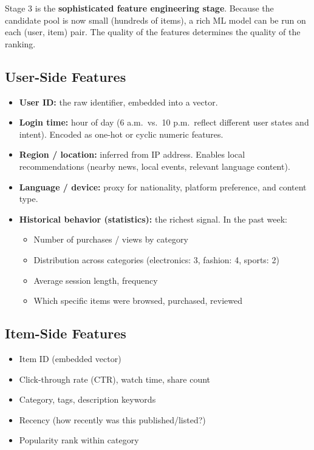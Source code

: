 \documentclass[11pt]{article}
\begin{document}
Stage 3 is the \textbf{sophisticated feature engineering stage}. Because
the candidate pool is now small (hundreds of items), a rich ML model
can be run on each (user, item) pair. The quality of the features
determines the quality of the ranking.

\subsection{User-Side Features}
\begin{itemize}
    \item \textbf{User ID:} the raw identifier, embedded into a vector.
    \item \textbf{Login time:} hour of day (6 a.m.\ vs.\ 10 p.m.\ reflect
      different user states and intent). Encoded as one-hot or cyclic
      numeric features.
    \item \textbf{Region / location:} inferred from IP address.
      Enables local recommendations (nearby news, local events, relevant
      language content).
    \item \textbf{Language / device:} proxy for nationality, platform
      preference, and content type.
    \item \textbf{Historical behavior (statistics):} the richest signal.
      In the past week:
      \begin{itemize}
          \item Number of purchases / views by category
          \item Distribution across categories (electronics: 3, fashion: 4,
            sports: 2)
          \item Average session length, frequency
          \item Which specific items were browsed, purchased, reviewed
      \end{itemize}
\end{itemize}

\subsection{Item-Side Features}
\begin{itemize}
    \item Item ID (embedded vector)
    \item Click-through rate (CTR), watch time, share count
    \item Category, tags, description keywords
    \item Recency (how recently was this published/listed?)
    \item Popularity rank within category
\end{itemize}
\end{document}
